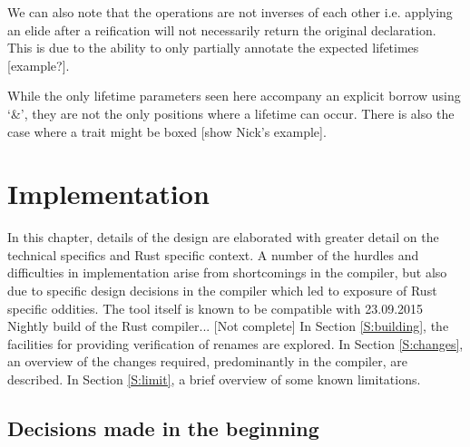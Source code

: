 We can also note that the operations are not inverses of each other i.e. applying an elide after a reification will not necessarily return the original declaration. This is due to the ability to only partially annotate the expected lifetimes [example?].

While the only lifetime parameters seen here accompany an explicit borrow using `\&', they are not the only positions where a lifetime can occur. There is also the case where a trait might be boxed [show Nick's example].


\chapter{Implementation}\label{C:impl}

In this chapter, details of the design are elaborated with greater detail on the technical specifics and Rust specific context. A number of the hurdles and difficulties in implementation arise from shortcomings in the compiler, but also due to specific design decisions in the compiler which led to exposure of Rust specific oddities. The tool itself is known to be compatible with 23.09.2015 Nightly build of the Rust compiler... [Not complete] In Section \ref{S:building}, the facilities for providing verification of renames are explored. In Section \ref{S:changes}, an overview of the changes required, predominantly in the compiler, are described. In Section \ref{S:limit}, a brief overview of some known limitations.



\section{Decisions made in the beginning}
